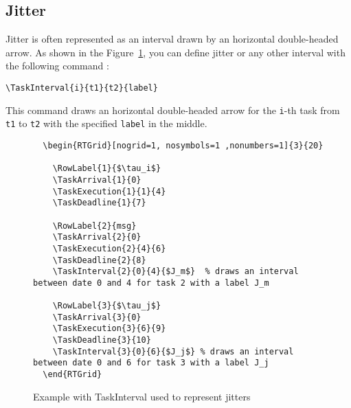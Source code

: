 \documentclass{article}
\begin{document}
\subsection{Jitter}


Jitter is often represented as an interval drawn by an horizontal double-headed arrow. As shown in the Figure~\ref{fig:interval}, you can define jitter or any other interval with the following command :

\begin{verbatim}
\TaskInterval{i}{t1}{t2}{label}
\end{verbatim}

This command draws an horizontal double-headed arrow for the \texttt{i}-th task from \texttt{t1} to \texttt{t2} with the specified \texttt{label} in the middle.

\begin{figure}[!htbp]
  \centering
  \begin{RTGrid}[nogrid=1, nosymbols=1 ,nonumbers=1]{3}{20}
  


  \end{RTGrid}  
\begin{verbatim}
  \begin{RTGrid}[nogrid=1, nosymbols=1 ,nonumbers=1]{3}{20}
  
    \RowLabel{1}{$\tau_i$}
    \TaskArrival{1}{0}            
    \TaskExecution{1}{1}{4}             
    \TaskDeadline{1}{7}           

    \RowLabel{2}{msg}
    \TaskArrival{2}{0}              
    \TaskExecution{2}{4}{6}             
    \TaskDeadline{2}{8}            
    \TaskInterval{2}{0}{4}{$J_m$}  % draws an interval between date 0 and 4 for task 2 with a label J_m 

    \RowLabel{3}{$\tau_j$}
    \TaskArrival{3}{0}             
    \TaskExecution{3}{6}{9}             
    \TaskDeadline{3}{10}          
    \TaskInterval{3}{0}{6}{$J_j$} % draws an interval between date 0 and 6 for task 3 with a label J_j 
  \end{RTGrid}  
\end{verbatim}
  \caption{Example with TaskInterval used to represent jitters}
  \label{fig:interval}
\end{figure}
\end{document}
